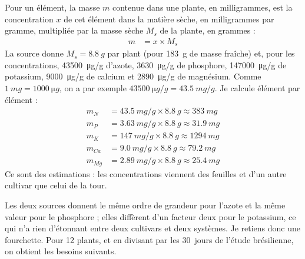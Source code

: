\begin{demonstration}
Pour un élément, la masse $m$ contenue dans une plante, en milligrammes, est la concentration $x$ de cet élément dans la matière sèche, en milligrammes par gramme, multipliée par la masse sèche $M_s$ de la plante, en grammes :
\begin{align*}
m &= x \times M_s
\end{align*}
La source  donne $M_s = \qty{8,8}{g}$ par plant (pour \qty{183}{g} de masse fraîche) et, pour les concentrations, \qty{43500}{\micro g/g} d'azote, \qty{3630}{\micro g/g} de phosphore, \qty{147000}{\micro g/g} de potassium, \qty{9000}{\micro g/g} de calcium et \qty{2890}{\micro g/g} de magnésium. Comme $\qty{1}{mg} = \qty{1000}{\micro g}$, on a par exemple $\qty{43500}{\micro g/g} = \qty{43,5}{mg/g}$. Je calcule élément par élément :
\begin{align*}
m_{N} &= \qty{43,5}{mg/g}\times\qty{8,8}{g} \approx \qty{383}{mg}\\
m_{P} &= \qty{3,63}{mg/g}\times\qty{8,8}{g} \approx \qty{31,9}{mg}\\
m_{K} &= \qty{147}{mg/g}\times\qty{8,8}{g} \approx \qty{1294}{mg}\\
m_{Ca} &= \qty{9,0}{mg/g}\times\qty{8,8}{g} \approx \qty{79,2}{mg}\\
m_{Mg} &= \qty{2,89}{mg/g}\times\qty{8,8}{g} \approx \qty{25,4}{mg}
\end{align*}
Ce sont des estimations : les concentrations viennent des feuilles et d'un autre cultivar que celui de la tour.
\end{demonstration}

Les deux sources donnent le même ordre de grandeur pour l'azote et la même valeur pour le phosphore ; elles diffèrent d'un facteur deux pour le potassium, ce qui n'a rien d'étonnant entre deux cultivars et deux systèmes. Je retiens donc une fourchette. Pour 12 plants, et en divisant par les \qty{30}{jours} de l'étude brésilienne, on obtient les besoins suivants.

